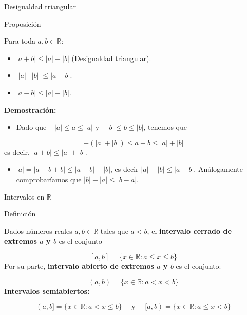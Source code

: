 \documentclass[ignorenonframetext,]{beamer}
\providecommand{\tightlist}{%
  \setlength{\itemsep}{0pt}\setlength{\parskip}{0pt}}
\begin{document}
\begin{frame}{Desigualdad triangular}
\protect\hypertarget{desigualdad-triangular}{}

Proposición

Para toda \(a,b \in \mathbb{R}\):

\begin{itemize}
\tightlist
\item
  \(|a+b| \leq |a| + |b|\) (Desigualdad triangular).
\item
  \(||a|-|b|| \leq |a-b|\).
\item
  \(|a-b| \leq |a|+|b|\).
\end{itemize}

\textbf{Demostración:}

\begin{itemize}
\tightlist
\item
  Dado que \(-|a| \leq a \leq |a|\) y \(-|b| \leq b \leq |b|\), tenemos
  que
\end{itemize}

\[ 
-(|a|+|b|) \leq a+b \leq  |a| + |b|
\] es decir, \(|a+b| \leq |a| + |b|\).

\begin{itemize}
\tightlist
\item
  \(|a| = |a-b+b| \leq |a-b| + |b|\), es decir \(|a|-|b| \leq |a-b|\).
  Análogamente comprobaríamos que \(|b|-|a| \leq |b-a|\).
\end{itemize}

\end{frame}

\begin{frame}{Intervalos en \(\mathbb{R}\)}
\protect\hypertarget{intervalos-en-mathbbr}{}

Definición

Dados números reales \(a,b \in \mathbb{R}\) tales que \(a<b\), el
\textbf{intervalo cerrado de extremos \(a\) y \(b\)} es el conjunto

\[
[a,b] = \{x\in \mathbb{R}: a \leq x \leq b \}
\] Por su parte, \textbf{intervalo abierto de extremos \(a\) y \(b\)} es
el conjunto:

\[
(a,b) = \{x\in \mathbb{R}: a < x < b \}
\] \textbf{Intervalos semiabiertos:}

\[
(a,b] = \{ x \in \mathbb{R}: a<x \leq b \} \quad \text{ y } \quad [a,b) = \{ x \in \mathbb{R}: a \leq x < b \}
\]

\end{frame}
\end{document}
